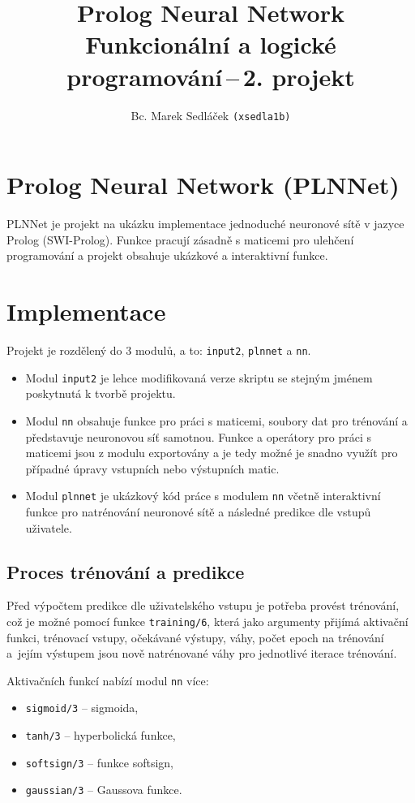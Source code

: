 \documentclass[a4paper, 11pt]{article}
\title{Prolog Neural Network\\\Large Funkcionální a logické programování\,--\,2. projekt}
\date{}
\author{Bc. Marek Sedláček \texttt{(xsedla1b)}}
\begin{document}
\maketitle

\section{Prolog Neural Network (PLNNet)}

PLNNet je projekt na ukázku implementace jednoduché neuronové sítě v jazyce Prolog (SWI-Prolog). Funkce pracují zásadně s maticemi pro ulehčení programování a projekt obsahuje ukázkové a interaktivní funkce.

\section{Implementace}

Projekt je rozdělený do 3 modulů, a to: \texttt{input2}, \texttt{plnnet} a \texttt{nn}. 

\begin{itemize}
    \item Modul \texttt{input2} je lehce modifikovaná verze skriptu se stejným jménem poskytnutá k tvorbě projektu.
    \item Modul \texttt{nn} obsahuje funkce pro práci s maticemi, soubory dat pro trénování a představuje neuronovou síť samotnou. Funkce a operátory pro práci s maticemi jsou z modulu exportovány a je tedy možné je snadno využít pro případné úpravy vstupních nebo výstupních matic.
    \item Modul \texttt{plnnet} je ukázkový kód práce s modulem \texttt{nn} včetně interaktivní funkce pro natrénování neuronové sítě a následné predikce dle vstupů uživatele. 
\end{itemize}

\subsection{Proces trénování a predikce}

Před výpočtem predikce dle uživatelského vstupu je potřeba provést trénování, což je možné pomocí funkce \texttt{training/6}, která jako argumenty přijímá aktivační funkci, trénovací vstupy, očekávané výstupy, váhy, počet epoch na trénování a~jejím výstupem jsou nově natrénované váhy pro jednotlivé iterace trénování.

Aktivačních funkcí nabízí modul \texttt{nn} více:
\begin{itemize}
    \item \texttt{sigmoid/3} -- sigmoida,
    \item \texttt{tanh/3} -- hyperbolická funkce,
    \item \texttt{softsign/3} -- funkce softsign,
    \item \texttt{gaussian/3} -- Gaussova funkce.
\end{itemize}
\end{document}
